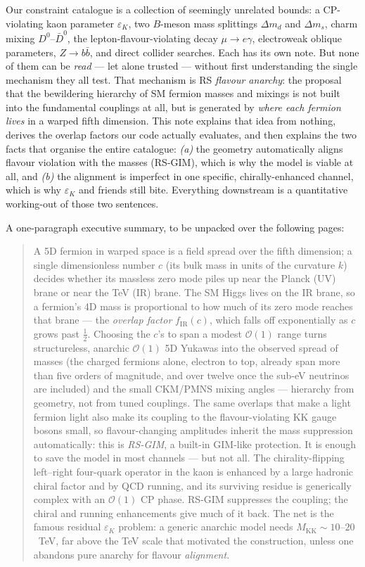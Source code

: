 \documentclass[11pt]{article}
\newcommand{\MKK}{M_{\mathrm{KK}}}
\newcommand{\half}{\tfrac{1}{2}}
\newcommand{\fIR}{f_{\mathrm{IR}}}
\newcommand{\epsK}{\varepsilon_K}
\theoremstyle{definition}
\begin{document}
Our constraint catalogue is a collection of seemingly unrelated bounds: a
CP-violating kaon parameter $\epsK$, two $B$-meson mass splittings $\Delta m_d$
and $\Delta m_s$, charm mixing $D^0$--$\bar D^0$, the lepton-flavour-violating
decay $\mu\to e\gamma$, electroweak oblique parameters, $Z\to b\bar b$, and direct
collider searches. Each has its own note. But none of them can be \emph{read} ---
let alone trusted --- without first understanding the single mechanism they all
test. That mechanism is RS \emph{flavour anarchy}: the proposal that the
bewildering hierarchy of SM fermion masses and mixings is not built into the
fundamental couplings at all, but is generated by \emph{where each fermion lives}
in a warped fifth dimension. This note explains that idea from nothing, derives
the overlap factors our code actually evaluates, and then explains the two facts
that organise the entire catalogue: \emph{(a)} the geometry automatically aligns
flavour violation with the masses (RS-GIM), which is why the model is viable at
all, and \emph{(b)} the alignment is imperfect in one specific, chirally-enhanced
channel, which is why $\epsK$ and friends still bite. Everything downstream is a
quantitative working-out of those two sentences.

A one-paragraph executive summary, to be unpacked over the following pages:

\begin{quote}
\small
A 5D fermion in warped space is a field spread over the fifth dimension; a single
dimensionless number $c$ (its bulk mass in units of the curvature $k$) decides
whether its massless zero mode piles up near the Planck (UV) brane or near the
TeV (IR) brane. The SM Higgs lives on the IR brane, so a fermion's 4D mass is
proportional to how much of its zero mode reaches that brane --- the
\emph{overlap factor} $\fIR(c)$, which falls off exponentially as $c$ grows past
$\half$. Choosing the $c$'s to span a modest $\mathcal{O}(1)$ range turns
structureless, anarchic $\mathcal{O}(1)$ 5D Yukawas into the observed spread of
masses (the charged fermions alone, electron to top, already span more than five
orders of magnitude, and over twelve once the sub-eV neutrinos are included) and
the small CKM/PMNS mixing angles --- hierarchy from geometry, not from tuned
couplings. The same
overlaps that make a light fermion light also make its coupling to the
flavour-violating KK gauge bosons small, so flavour-changing amplitudes inherit
the mass suppression automatically: this is \emph{RS-GIM}, a built-in GIM-like
protection. It is enough to save the model in most channels --- but not all. The
chirality-flipping left--right four-quark operator in the kaon is enhanced by a
large hadronic chiral factor and by QCD running, and its surviving residue is
generically complex with an $\mathcal{O}(1)$ CP phase. RS-GIM suppresses the
coupling; the chiral and running enhancements give much of it back. The net is
the famous residual $\epsK$ problem: a generic anarchic model needs
$\MKK\sim10$--$20$~TeV, far above the TeV scale that motivated the construction,
unless one abandons pure anarchy for flavour \emph{alignment}.
\end{quote}
\end{document}
